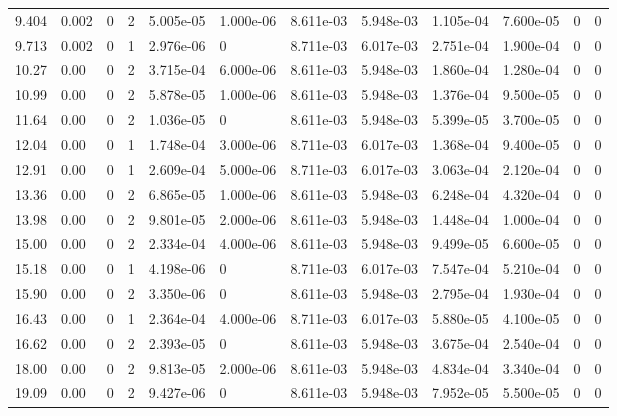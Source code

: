 \documentclass[preview]{standalone}
\begin{document}
{{\begin{tabular}{L{1.2cm}C{1.2cm} C{0.3cm}C{0.5cm} C{1.4cm}C{1.4cm} C{1.4cm}C{1.4cm} C{1.6cm}C{1.6cm} C{1.6cm}C{1.6cm}}
  9.404  &  0.002  & 0     &  2 &  5.005e-05  & 1.000e-06  &  8.611e-03&   5.948e-03& 1.105e-04 & 7.600e-05   &  0 & 0  \\ 
  9.713  &  0.002  & 0     &  1 &  2.976e-06  & 0  &  8.711e-03&   6.017e-03& 2.751e-04 & 1.900e-04   &  0 & 0  \\ 
  10.27  &  0.00  & 0     &  2 &  3.715e-04  & 6.000e-06  &  8.611e-03&   5.948e-03& 1.860e-04 & 1.280e-04   &  0 & 0  \\ 
  10.99  &  0.00  & 0     &  2 &  5.878e-05  & 1.000e-06  &  8.611e-03&   5.948e-03& 1.376e-04 & 9.500e-05   &  0 & 0  \\ 
  11.64  &  0.00  & 0     &  2 &  1.036e-05  & 0  &  8.611e-03&   5.948e-03& 5.399e-05 & 3.700e-05   &  0 & 0  \\ 
  12.04  &  0.00  & 0     &  1 &  1.748e-04  & 3.000e-06  &  8.711e-03&   6.017e-03& 1.368e-04 & 9.400e-05   &  0 & 0  \\ 
  12.91  &  0.00  & 0     &  1 &  2.609e-04  & 5.000e-06  &  8.711e-03&   6.017e-03& 3.063e-04 & 2.120e-04   &  0 & 0  \\ 
  13.36  &  0.00  & 0     &  2 &  6.865e-05  & 1.000e-06  &  8.611e-03&   5.948e-03& 6.248e-04 & 4.320e-04   &  0 & 0  \\ 
  13.98  &  0.00  & 0     &  2 &  9.801e-05  & 2.000e-06  &  8.611e-03&   5.948e-03& 1.448e-04 & 1.000e-04   &  0 & 0  \\ 
  15.00  &  0.00  & 0     &  2 &  2.334e-04  & 4.000e-06  &  8.611e-03&   5.948e-03& 9.499e-05 & 6.600e-05   &  0 & 0  \\ 
  15.18  &  0.00  & 0     &  1 &  4.198e-06  & 0  &  8.711e-03&   6.017e-03& 7.547e-04 & 5.210e-04   &  0 & 0  \\ 
  15.90  &  0.00  & 0     &  2 &  3.350e-06  & 0  &  8.611e-03&   5.948e-03& 2.795e-04 & 1.930e-04   &  0 & 0  \\ 
  16.43  &  0.00  & 0     &  1 &  2.364e-04  & 4.000e-06  &  8.711e-03&   6.017e-03& 5.880e-05 & 4.100e-05   &  0 & 0  \\ 
  16.62  &  0.00  & 0     &  2 &  2.393e-05  & 0  &  8.611e-03&   5.948e-03& 3.675e-04 & 2.540e-04   &  0 & 0  \\ 
  18.00  &  0.00  & 0     &  2 &  9.813e-05  & 2.000e-06  &  8.611e-03&   5.948e-03& 4.834e-04 & 3.340e-04   &  0 & 0  \\ 
  19.09  &  0.00  & 0     &  2 &  9.427e-06  & 0  &  8.611e-03&   5.948e-03& 7.952e-05 & 5.500e-05   &  0 & 0  \\ 
\hline 
\end{tabular} 

}}
\end{document}
